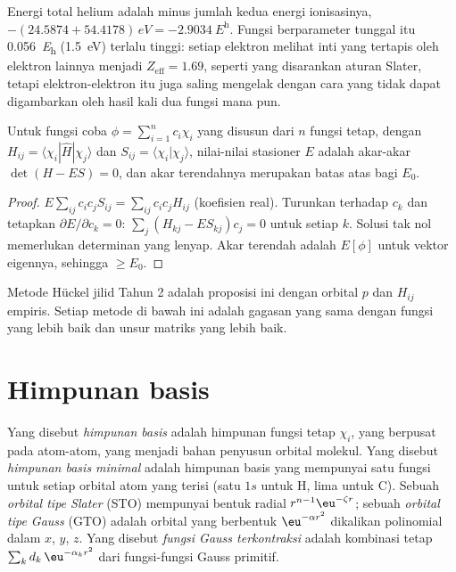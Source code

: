 \begin{example}\label{ex:b3:computational-chemistry:helium}
Energi total helium adalah minus jumlah kedua energi ionisasinya,
$-(24.5874 + 54.4178)\,\unit{eV} = \qty{-2.9034}{\hartree}$. Fungsi
berparameter tunggal itu \qty{0.056}{\hartree} (\qty{1.5}{eV}) terlalu
tinggi: setiap elektron melihat inti yang tertapis oleh elektron lainnya
menjadi $Z_{\mathrm{eff}} = 1.69$, seperti yang disarankan aturan Slater,
tetapi elektron-elektron itu juga saling mengelak dengan cara yang tidak
dapat digambarkan oleh hasil kali dua fungsi mana pun.
\end{example}

\begin{proposition}\label{prop:b3:computational-chemistry:linear-variation}
Untuk fungsi coba $\phi = \sum_{i=1}^n c_i\chi_i$ yang disusun dari $n$ fungsi
tetap, dengan $H_{ij} = \langle\chi_i|\hat H|\chi_j\rangle$ dan $S_{ij} = \langle\chi_i|\chi_j
\rangle$, nilai-nilai stasioner $E$ adalah akar-akar $\det(H - ES) = 0$, dan
akar terendahnya merupakan batas atas bagi $E_0$.
\end{proposition}

\begin{proof}
$E\sum_{ij}c_ic_jS_{ij} = \sum_{ij}c_ic_jH_{ij}$ (koefisien real). Turunkan
terhadap $c_k$ dan tetapkan $\partial E/\partial c_k = 0$: $\sum_j(H_{kj} -
ES_{kj})c_j = 0$ untuk setiap $k$. Solusi tak nol memerlukan determinan yang
lenyap. Akar terendah adalah $E[\phi]$ untuk vektor eigennya, sehingga
$\ge E_0$.
\end{proof}

Metode Hückel jilid Tahun 2 adalah proposisi ini dengan orbital $p$ dan $H_{ij}$
empiris. Setiap metode di bawah ini adalah gagasan yang sama dengan fungsi
yang lebih baik dan unsur matriks yang lebih baik.

\section{Himpunan basis}

\begin{definition}\label{def:b3:computational-chemistry:basis}
Yang disebut \emph{himpunan basis} adalah himpunan
fungsi tetap $\chi_i$, yang berpusat pada atom-atom, yang menjadi bahan
penyusun orbital molekul. Yang disebut \emph{himpunan basis
minimal} adalah himpunan basis yang mempunyai
satu fungsi untuk setiap orbital atom yang terisi (satu $1s$ untuk H, lima
untuk C). Sebuah \emph{orbital tipe Slater} (STO) mempunyai bentuk radial $r^{n-1}\eu^{-\zeta r}$; sebuah
\emph{orbital tipe Gauss} (GTO) adalah orbital yang berbentuk
$\eu^{-\alpha r^2}$ dikalikan polinomial dalam $x$, $y$, $z$. Yang disebut
\emph{fungsi Gauss terkontraksi} adalah
kombinasi tetap $\sum_kd_k\,\eu^{-\alpha_kr^2}$ dari fungsi-fungsi Gauss
primitif.
\end{definition}

